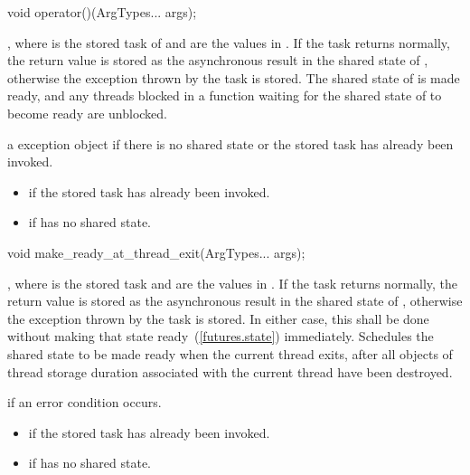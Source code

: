%
%
\begin{itemdecl}
void operator()(ArgTypes... args);
\end{itemdecl}

\begin{itemdescr}
\pnum
\effects {}, where  is the
stored task of  and
 are the values in . If the task returns normally,
the return value is stored as the asynchronous result in the shared state of
, otherwise the exception thrown by the task is stored. The
shared state of  is made ready, and any threads blocked in a
function waiting for
the shared state of  to become ready are unblocked.

\pnum
\throws a  exception object if there is no shared
state or the stored task has already been invoked.

\pnum
\errors
\begin{itemize}
\item {} if
the stored task has already been invoked.
\item {} if  has no shared state.
\end{itemize}
\end{itemdescr}

%
%
\begin{itemdecl}
void make_ready_at_thread_exit(ArgTypes... args);
\end{itemdecl}

\begin{itemdescr}
\pnum
\effects {}, where  is the
stored task and
 are the values in . If the task returns normally,
the return value is stored as the asynchronous result in the shared state of
, otherwise the exception thrown by the task is stored. In either
case, this shall be done without making that state ready~(\ref{futures.state}) immediately. Schedules
the shared state to be made ready when the current thread exits,
after all objects of thread storage duration associated with the current thread
have been destroyed.

\pnum
\throws {} if an error condition occurs.

\pnum
\errors
\begin{itemize}
\item {} if the
stored task has already been invoked.
\item {} if  has no shared state.
\end{itemize}
\end{itemdescr}

